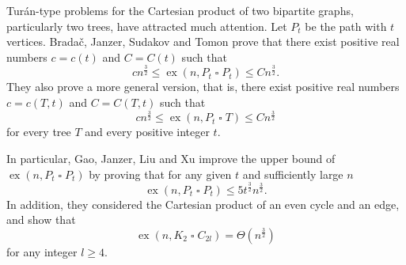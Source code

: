 \documentclass[11pt,a4paper]{article}
\theoremstyle{definition}
\DeclareMathOperator{\ex}{ex}
\begin{document}
                 Tur\'an-type problems for the Cartesian product of two bipartite graphs, particularly two trees, have attracted much attention.
        Let $P_t$ be the path with $t$ vertices.
        Brada\v{c}, Janzer, Sudakov and Tomon \cite{bradavc2023turan} prove that there exist positive real numbers $c= c(t)$ and $C = C(t)$ such that
        \begin{equation*}
            cn^\frac{3}{2} \leq \ex(n, P_t \mathbin{\square} P_t) \leq Cn^{\frac{3}{2}}.
        \end{equation*}
        They also prove a more general version, that is, there exist positive real numbers $c=c(T,t)$ and $C=C(T,t)$ such that
        \[
        c n^{\frac{3}{2}} \leq \ex(n, P_t \mathbin{\square} T) \leq C n^{\frac{3}{2}}
        \]
        for every tree $T$ and every positive integer $t$.

        In particular, Gao, Janzer, Liu and Xu \cite{GaoExtre2023} improve the upper bound of $\ex(n, P_t \mathbin{\square} P_t)$ by proving that for any given $t$ and sufficiently large $n$
        \begin{equation*}
            \ex(n, P_t \mathbin{\square} P_t) \leq 5 t^{\frac{3}{2}} n^{\frac{3}{2}}.
        \end{equation*}
        In addition, they considered the Cartesian product of an even cycle and an edge, and show that
        \begin{equation*}
            \ex(n, K_2 \mathbin{\square} C_{2l}) = \Theta(n^{\frac{3}{2}})
        \end{equation*}
        for any integer $l \geq 4$.

\end{document}
